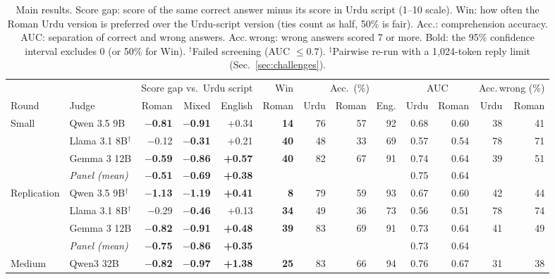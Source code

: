 \begin{table}[t]
\centering
\caption{Main results. Score gap: score of the same correct answer minus its score in Urdu script (1--10 scale). Win: how often the Roman Urdu version is preferred over the Urdu-script version (ties count as half, 50\% is fair). Acc.: comprehension accuracy. AUC: separation of correct and wrong answers. Acc.\,wrong: wrong answers scored 7 or more. Bold: the 95\% confidence interval excludes 0 (or 50\% for Win). $^\dagger$Failed screening (AUC $\leq 0.7$). $^\ddagger$Pairwise re-run with a 1{,}024-token reply limit (Sec.~\ref{sec:challenges}).}
\label{tab:main}
\small
\setlength{\tabcolsep}{4pt}
\begin{tabular}{@{}ll rrr r rrr rr rr@{}}
\toprule
 & & \multicolumn{3}{c}{Score gap vs.\ Urdu script} & Win & \multicolumn{3}{c}{Acc.\ (\%)} & \multicolumn{2}{c}{AUC} & \multicolumn{2}{c}{Acc.\,wrong (\%)} \\
\cmidrule(lr){3-5}\cmidrule(lr){6-6}\cmidrule(lr){7-9}\cmidrule(lr){10-11}\cmidrule(lr){12-13}
Round & Judge & Roman & Mixed & English & Roman & Urdu & Roman & Eng. & Urdu & Roman & Urdu & Roman \\
\midrule
Small & Qwen 3.5 9B & \textbf{$-$0.81} & \textbf{$-$0.91} & +0.34 & \textbf{14} & 76 & 57 & 92 & 0.68 & 0.60 & 38 & 41 \\
 & Llama 3.1 8B$^\dagger$ & $-$0.12 & \textbf{$-$0.31} & +0.21 & \textbf{40} & 48 & 33 & 69 & 0.57 & 0.54 & 78 & 71 \\
 & Gemma 3 12B & \textbf{$-$0.59} & \textbf{$-$0.86} & \textbf{+0.57} & \textbf{40} & 82 & 67 & 91 & 0.74 & 0.64 & 39 & 51 \\
 & \emph{Panel (mean)} & \textbf{$-$0.51} & \textbf{$-$0.69} & \textbf{+0.38} &  &  &  &  & 0.75 & 0.64 &  &  \\
\midrule
Replication & Qwen 3.5 9B$^\dagger$ & \textbf{$-$1.13} & \textbf{$-$1.19} & \textbf{+0.41} & \textbf{8} & 79 & 59 & 93 & 0.67 & 0.60 & 42 & 44 \\
 & Llama 3.1 8B$^\dagger$ & $-$0.29 & \textbf{$-$0.46} & +0.13 & \textbf{34} & 49 & 36 & 73 & 0.56 & 0.51 & 78 & 74 \\
 & Gemma 3 12B & \textbf{$-$0.82} & \textbf{$-$0.91} & \textbf{+0.48} & \textbf{39} & 83 & 69 & 91 & 0.73 & 0.64 & 41 & 49 \\
 & \emph{Panel (mean)} & \textbf{$-$0.75} & \textbf{$-$0.86} & \textbf{+0.35} &  &  &  &  & 0.73 & 0.64 &  &  \\
\midrule
Medium & Qwen3 32B & \textbf{$-$0.82} & \textbf{$-$0.97} & \textbf{+1.38} & \textbf{25} & 83 & 66 & 94 & 0.76 & 0.67 & 31 & 38 \\

\end{tabular}
\end{table}

